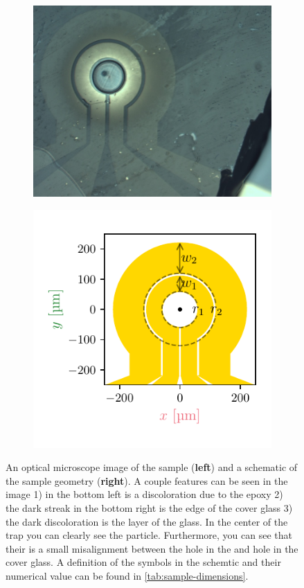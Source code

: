 \begin{figure}
    \centering
    \begin{subfigure}[c]{.5\textwidth}
        \centering
        \includegraphics{figures/sample/trap_optical_microscope.pdf}
    \end{subfigure}%
    \begin{subfigure}[c]{.5\textwidth}
        \centering
        \includegraphics{figures/sample/trap_geometry.pdf}
    \end{subfigure}%
    \caption{An optical microscope image of the sample (\textbf{left}) and a schematic of the sample geometry (\textbf{right}). A couple features can be seen in the image 1) in the bottom left is a discoloration due to the epoxy 2) the dark streak in the bottom right is the edge of the cover glass 3) the dark discoloration is the  layer of the glass. In the center of the trap you can clearly see the  particle. Furthermore, you can see that their is a small misalignment between the hole in the  and hole in the cover glass. A definition of the symbols in the schemtic and their numerical value can be found in \autoref{tab:sample-dimensions}.}
    \label{fig:sample-dimensions}
\end{figure}

